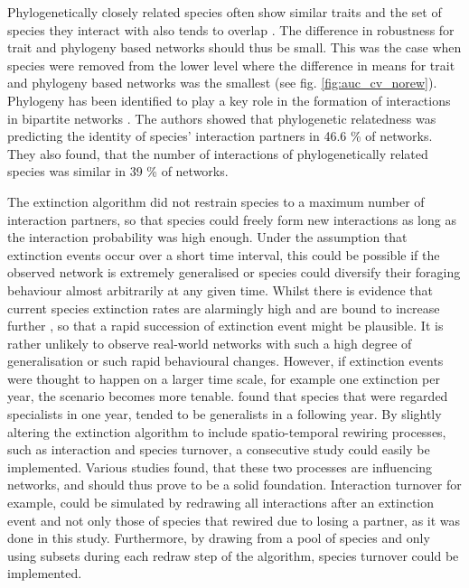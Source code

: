 \documentclass[12pt,a4paper]{article}
\begin{document}
Phylogenetically closely related species often show similar traits and the set of species they interact with also tends to overlap \parencite{Rezende2007, Gomez2010}. The difference in robustness for trait and phylogeny based networks should thus be small. This was the case when species were removed from the lower level where the difference in means for trait and phylogeny based networks was the smallest (see fig. \ref{fig:auc_cv_norew}). 
Phylogeny has been identified to play a key role in the formation of interactions in bipartite networks \parencite{Rezende2007}. The authors showed that phylogenetic relatedness was predicting the identity of species' interaction partners in 46.6 \% of networks. They also found, that the number of interactions of phylogenetically related species was similar in 39 \% of networks.

The extinction algorithm did not restrain species to a maximum number of interaction partners, so that species could freely form new interactions as long as the interaction probability was high enough. Under the assumption that extinction events occur over a short time interval, this could be possible if the observed network is extremely generalised or species could diversify their foraging behaviour almost arbitrarily at any given time. Whilst there is evidence that current species extinction rates are alarmingly high and are bound to increase further \parencite{Ceballos2015}, so that a rapid succession of extinction event might be plausible. It is rather unlikely to observe real-world networks with such a high degree of generalisation or such rapid behavioural changes. However, if extinction events were thought to happen on a larger time scale, for example one extinction per year, the scenario becomes more tenable. \citeauthor{Petanidou2008} found that species that were regarded specialists in one year, tended to be generalists in a following year. By slightly altering the extinction algorithm to include spatio-temporal rewiring processes, such as interaction and species turnover, a consecutive study could easily be implemented. Various studies found, that these two processes are influencing networks, and should thus prove to be a solid foundation\parencite{Poisot2012, Morente-Lopez2018, Brimacombe2021}. Interaction turnover for example, could be simulated by redrawing all interactions after an extinction event and not only those of species that rewired due to losing a partner, as it was done in this study. Furthermore, by drawing from a pool of species and only using subsets during each redraw step of the algorithm, species turnover could be implemented.
\end{document}
